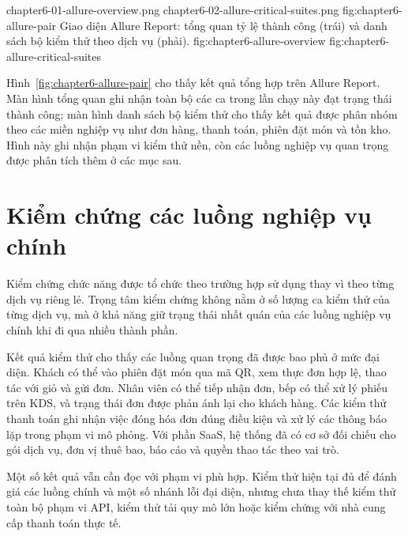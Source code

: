   {chapter6-01-allure-overview.png}
  {chapter6-02-allure-critical-suites.png}
  {fig:chapter6-allure-pair}
  {Giao diện Allure Report: tổng quan tỷ lệ thành công (trái) và danh sách bộ kiểm thử theo dịch vụ (phải).}
  {fig:chapter6-allure-overview}
  {fig:chapter6-allure-critical-suites}

Hình~\ref{fig:chapter6-allure-pair} cho thấy kết quả tổng hợp trên Allure Report. Màn hình tổng quan ghi nhận toàn bộ các ca trong lần chạy này đạt trạng thái thành công; màn hình danh sách bộ kiểm thử cho thấy kết quả được phân nhóm theo các miền nghiệp vụ như đơn hàng, thanh toán, phiên đặt món và tồn kho. Hình này ghi nhận phạm vi kiểm thử nền, còn các luồng nghiệp vụ quan trọng được phân tích thêm ở các mục sau.

\section{Kiểm chứng các luồng nghiệp vụ chính}

Kiểm chứng chức năng được tổ chức theo trường hợp sử dụng thay vì theo từng dịch vụ riêng lẻ. Trọng tâm kiểm chứng không nằm ở số lượng ca kiểm thử của từng dịch vụ, mà ở khả năng giữ trạng thái nhất quán của các luồng nghiệp vụ chính khi đi qua nhiều thành phần.

Kết quả kiểm thử cho thấy các luồng quan trọng đã được bao phủ ở mức đại diện. Khách có thể vào phiên đặt món qua mã QR, xem thực đơn hợp lệ, thao tác với giỏ và gửi đơn. Nhân viên có thể tiếp nhận đơn, bếp có thể xử lý phiếu trên KDS, và trạng thái đơn được phản ánh lại cho khách hàng. Các kiểm thử thanh toán ghi nhận việc đóng hóa đơn đúng điều kiện và xử lý các thông báo lặp trong phạm vi mô phỏng. Với phần SaaS, hệ thống đã có cơ sở đối chiếu cho gói dịch vụ, đơn vị thuê bao, báo cáo và quyền thao tác theo vai trò.

Một số kết quả vẫn cần đọc với phạm vi phù hợp. Kiểm thử hiện tại đủ để đánh giá các luồng chính và một số nhánh lỗi đại diện, nhưng chưa thay thế kiểm thử toàn bộ phạm vi API, kiểm thử tải quy mô lớn hoặc kiểm chứng với nhà cung cấp thanh toán thực tế.

